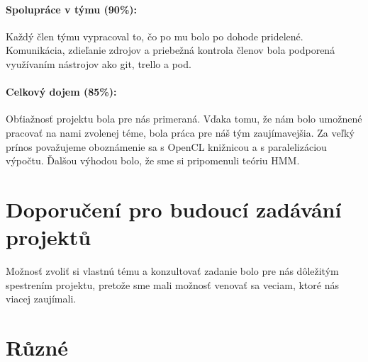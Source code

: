 \documentclass[11pt,a4paper]{article}
\begin{document}
\paragraph{Spolupráce v týmu (90\%):}
Každý člen týmu vypracoval to, čo po mu bolo po dohode pridelené. Komunikácia, zdieľanie zdrojov a priebežná kontrola členov bola podporená využívaním nástrojov ako git, trello a pod.

\paragraph{Celkový dojem (85\%):} 
Obťiažnosť projektu bola pre nás primeraná. Vďaka tomu, že nám bolo umožnené pracovať na nami zvolenej téme, bola práca pre náš tým zaujímavejšia. Za veľký prínos považujeme oboznámenie sa s OpenCL knižnicou a s paralelizáciou výpočtu. Ďalšou výhodou bolo, že sme si pripomenuli teóriu HMM.

\section{Doporučení pro budoucí zadávání projektů}
Možnosť zvoliť si vlastnú tému a konzultovať zadanie bolo pre nás dôležitým spestrením projektu, pretože sme mali možnosť venovať sa veciam, ktoré nás viacej zaujímali.

\section{Různé}

\end{document}
